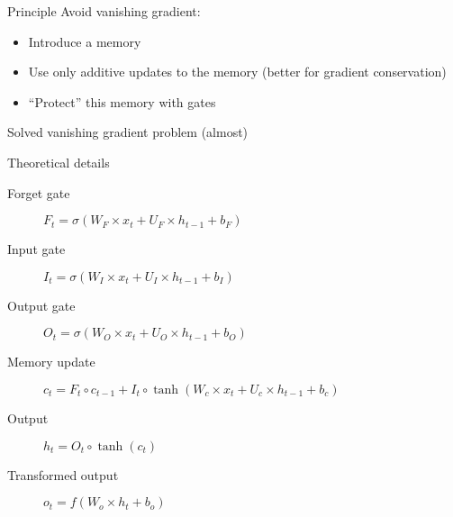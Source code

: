 \begin{frame}{Principle}
  Avoid vanishing gradient:
  \begin{itemize}[<+->]
    \item Introduce a memory
    \item Use only additive updates to the memory (better for gradient conservation)
    \item “Protect” this memory with gates
  \end{itemize}
\end{frame}

\begin{frame}{Solved vanishing gradient problem (almost)}
\end{frame}

\begin{frame}{Theoretical details}
  \begin{description}
  \item[Forget gate] $F_t = \sigma(W_F \times x_t + U_F \times h_{t - 1} + b_F)$ 
  \item[Input gate] $I_t = \sigma(W_I \times x_t + U_I \times h_{t - 1} + b_I)$
  \item[Output gate] $O_t = \sigma(W_O \times x_{t} + U_O \times h_{t - 1} + b_O)$
  \item[Memory update] $c_t = F_t \circ c_{t - 1} + I_t \circ \tanh(W_c \times x_t + U_c \times h_{t-1} + b_c)$
  \item[Output] $h_t = O_t \circ \tanh(c_t)$
  \item[Transformed output] $o_t = f(W_o \times h_t + b_o)$
  \end{description}
\end{frame}
